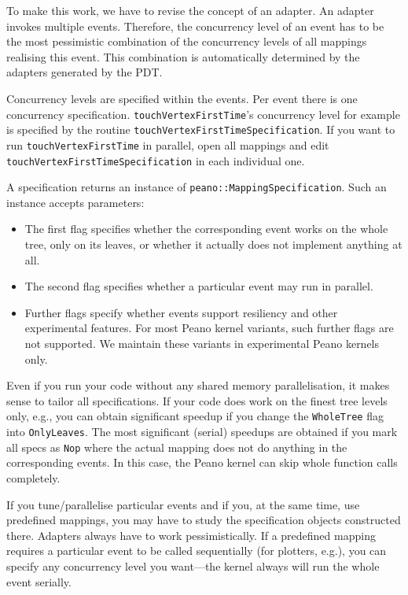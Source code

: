 To make this work, we have to revise the concept of an adapter. 
An adapter invokes multiple events.
Therefore, the concurrency level of an event has to be the most pessimistic
combination of the concurrency levels of all mappings realising this event.
This combination is automatically determined by the adapters generated by the
PDT.


Concurrency levels are specified within the events. 
Per event there is one concurrency specification. 
\texttt{touchVertexFirstTime}'s concurrency level for example is specified by
the routine \texttt{touchVertexFirstTimeSpecification}.
If you want to run \texttt{touchVertexFirstTime} in parallel, open all mappings
and edit \texttt{touchVertexFirstTimeSpecification} in each individual one.


A specification returns an instance of \texttt{peano::MappingSpecification}. 
Such an instance accepts parameters:
\begin{itemize}
  \item The first flag specifies whether the corresponding event works on the
  whole tree, only on its leaves, or whether it actually does not implement
  anything at all.
  \item The second flag specifies whether a particular event may run in
  parallel.
  \item Further flags specify whether events support resiliency and other
  experimental features. For most Peano kernel variants, such further flags are
  not supported. We maintain these variants in experimental Peano kernels only.
\end{itemize}

\begin{remark}
Even if you run your code without any shared memory parallelisation, it makes
sense to tailor all specifications. If your code does work on the finest tree
levels only, e.g., you can obtain significant speedup if you change the
\texttt{WholeTree} flag into \texttt{OnlyLeaves}. The most significant (serial)
speedups are obtained if you mark all specs as \texttt{Nop} where the actual
mapping does not do anything in the corresponding events. In this case, the
Peano kernel can skip whole function calls completely.
\end{remark}

\begin{remark}
If you tune/parallelise particular events and if you, at the same time, use
predefined mappings, you may have to study the specification objects
constructed there. Adapters always have to work pessimistically. If a predefined
mapping requires a particular event to be called sequentially (for plotters,
e.g.), you can specify any concurrency level you want---the kernel always will
run the whole event serially.
\end{remark}


